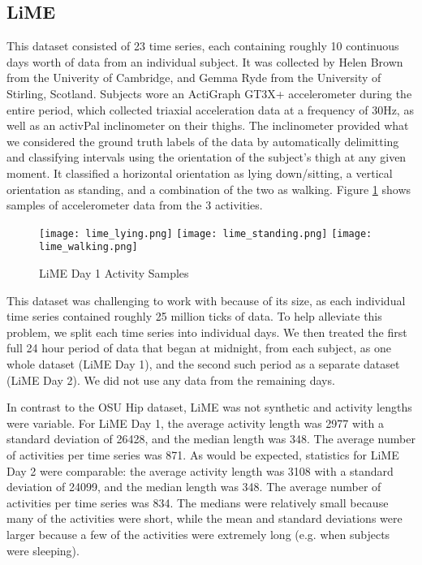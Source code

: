 \subsection{LiME}
This dataset consisted of 23 time series, each containing roughly 10 continuous
days worth of data from an individual subject. It was collected by Helen Brown from
the Univerity of Cambridge, and Gemma Ryde from the University of Stirling, Scotland.
Subjects wore an ActiGraph GT3X+
accelerometer during the entire period, which collected triaxial acceleration data at a frequency
of 30Hz, as well as an activPal inclinometer on their thighs. The inclinometer
provided what we considered the ground truth labels of the data by automatically
delimitting and classifying intervals using the orientation of the subject's thigh at any given moment. It 
classified a horizontal orientation as lying down/sitting,
a vertical orientation as standing, and a combination of the two as walking. Figure
\ref{fig:lime_activities} shows samples of accelerometer data from the 3 activities.

\begin{figure}
 \centering
 \texttt{[image: lime\_lying.png]}
 \texttt{[image: lime\_standing.png]}
 \texttt{[image: lime\_walking.png]}
 \caption{LiME Day 1 Activity Samples}
 \label{fig:lime_activities}
\end{figure}

This dataset was challenging to work with because of its size, as each individual time series
contained roughly 25 million ticks of data. To help alleviate this problem, we split each
time series into individual days. We then treated the first full 24 hour period of data that began at midnight,
from each subject, as one whole dataset (LiME Day 1), and the second such period as a separate dataset
(LiME Day 2). We did not use any data from the remaining days.

In contrast to the OSU Hip dataset, LiME
was not synthetic and activity lengths were variable. For LiME Day 1, the
average activity length was 2977 with a standard deviation of 26428, and the
median length was 348. The average number of activities per time series was
871. As would be expected, statistics for LiME Day 2 were comparable: the
average activity length was 3108 with a standard deviation of 24099, and the
median length was 348. The average number of activities per time series was 834.
The medians were relatively small because many of the activities were short,
while the mean and standard deviations were larger because a few of the
activities were extremely long (e.g. when subjects were sleeping).

